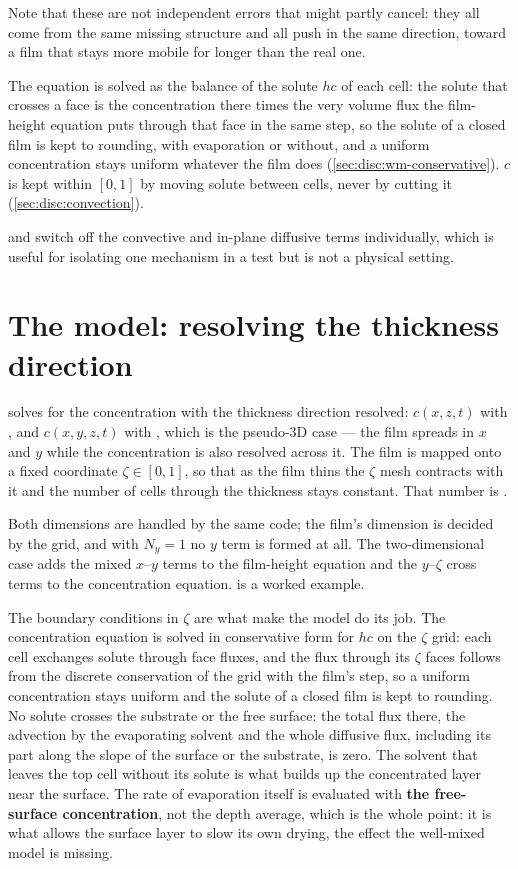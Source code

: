 Note that these are not independent errors that might partly cancel: they all
come from the same missing structure and all push in the same direction,
toward a film that stays more mobile for longer than the real one.

The equation is solved as the balance of the solute $hc$ of each cell: the
solute that crosses a face is the concentration there times the very volume
flux the film-height equation puts through that face in the same step, so the
solute of a closed film is kept to rounding, with evaporation or without, and
a uniform concentration stays uniform whatever the film does
(\cref{sec:disc:wm-conservative}). $c$ is kept within $[0, 1]$ by moving
solute between cells, never by cutting it (\cref{sec:disc:convection}).

 and  switch off the convective and in-plane
diffusive terms individually, which is useful for isolating one mechanism in a
test but is not a physical setting.

\section{The \texorpdfstring{}{CZ} model: resolving the thickness direction}
\label{sec:conc:cz}

 solves for the concentration with the
thickness direction resolved: $c(x,z,t)$ with , and
$c(x,y,z,t)$ with , which is the pseudo-3D case ---
the film spreads in $x$ and $y$ while the concentration is also resolved
across it. The film is mapped onto a fixed coordinate $\zeta \in [0,1]$, so
that as the film thins the $\zeta$ mesh contracts with it and the number of
cells through the thickness stays constant. That number is .

Both dimensions are handled by the same code; the film's dimension is decided
by the grid, and with $N_y = 1$ no $y$ term is formed at all. The two-dimensional
case adds the mixed $x$--$y$ terms to the film-height equation and the
$y$--$\zeta$ cross terms to the concentration equation. 
is a worked example.

The boundary conditions in $\zeta$ are what make the model do its job. The
concentration equation is solved in conservative form for $hc$ on the $\zeta$
grid: each cell exchanges solute through face fluxes, and the flux through its
$\zeta$ faces follows from the discrete conservation of the grid with the
film's step, so a uniform concentration stays uniform and the solute of a
closed film is kept to rounding. No solute crosses the substrate or the free
surface: the total flux there, the advection by the evaporating solvent and
the whole diffusive flux, including its part along the slope of the surface
or the substrate, is zero. The solvent that leaves the top cell without its
solute is what builds up the concentrated layer near the surface. The rate of
evaporation itself is evaluated with \textbf{the free-surface concentration},
not the depth average, which is the whole point: it is what allows the surface
layer to slow its own drying, the effect the well-mixed model is missing.

